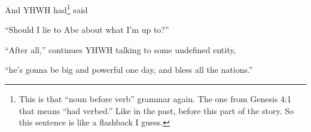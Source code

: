 {
}
{
}
{
	And YHWH had\footnote{
		This is that ``noun before verb'' grammar again.
		The one from Genesis 4:1 that means ``had verbed.''
		Like in the past, before this part of the story.
		So this sentence is like a flashback I guess.
	}
	said%
	
	``Should I lie to Abe about what I'm up to?''
}

{
}
{
}
{
	``After all,'' continues YHWH talking to some undefined entity,
	
	``he's gonna be big and powerful one day, and bless all the nations.''
}

